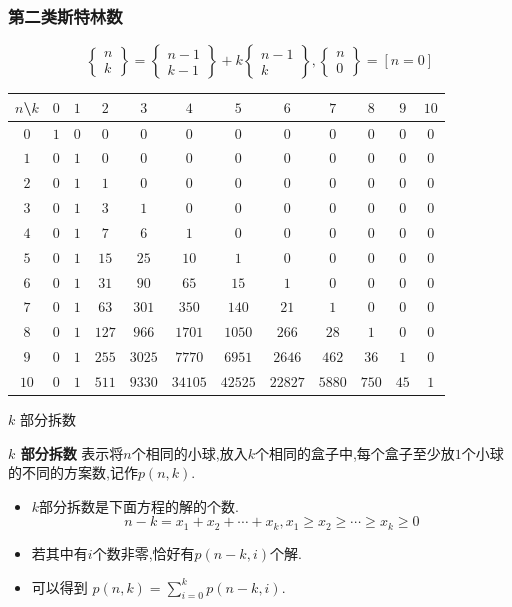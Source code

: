 \documentclass[aspectratio=169]{beamer}  %
\newcommand{\pau}{\pause}
\begin{document}
\begin{frame}[fragile]
    \frametitle{第二类斯特林数}
    $$\begin{Bmatrix}n\\k\end{Bmatrix}=\begin{Bmatrix}n-1\\k-1\end{Bmatrix}+k\begin{Bmatrix}n-1\\k\end{Bmatrix},\begin{Bmatrix}n\\0\end{Bmatrix}=[n=0]$$
	\begin{center}
		\footnotesize
		\begin{tabular}{c|ccccccccccc}
			$n$\textbackslash$k$&$0$&$1$&$2$&$3$&$4$&$5$&$6$&$7$&$8$&$9$&$10$\\\hline
			$0$&$1$&$0$&$0$&$0$&$0$&$0$&$0$&$0$&$0$&$0$&$0$\\
			$1$&$0$&$1$&$0$&$0$&$0$&$0$&$0$&$0$&$0$&$0$&$0$\\
			$2$&$0$&$1$&$1$&$0$&$0$&$0$&$0$&$0$&$0$&$0$&$0$\\
			$3$&$0$&$1$&$3$&$1$&$0$&$0$&$0$&$0$&$0$&$0$&$0$\\
			$4$&$0$&$1$&$7$&$6$&$1$&$0$&$0$&$0$&$0$&$0$&$0$\\
			$5$&$0$&$1$&$15$&$25$&$10$&$1$&$0$&$0$&$0$&$0$&$0$\\
			$6$&$0$&$1$&$31$&$90$&$65$&$15$&$1$&$0$&$0$&$0$&$0$\\
			$7$&$0$&$1$&$63$&$301$&$350$&$140$&$21$&$1$&$0$&$0$&$0$\\
			$8$&$0$&$1$&$127$&$966$&$1701$&$1050$&$266$&$28$&$1$&$0$&$0$\\
			$9$&$0$&$1$&$255$&$3025$&$7770$&$6951$&$2646$&$462$&$36$&$1$&$0$\\
			$10$&$0$&$1$&$511$&$9330$&$34105$&$42525$&$22827$&$5880$&$750$&$45$&$1$\\
		\end{tabular}
	\end{center}
\end{frame}

\begin{frame}[fragile]{$k$ 部分拆数}
    \begin{definition}{\textbf{$k$ 部分拆数}}
        表示将$n$个相同的小球,放入$k$个相同的盒子中,每个盒子至少放$1$个小球的不同的方案数,记作$p(n,k)$.
    \end{definition}\pau
    \begin{itemize}
    	\item $k$部分拆数是下面方程的解的个数.$$n-k=x_1+x_2+\cdots+x_k,x_1\geq x_2\geq\cdots\geq x_k\geq0$$\pau
    	\item 若其中有$i$个数非零,恰好有$p(n-k,i)$个解.\pau
    	\item 可以得到 $p(n,k)=\sum\limits_{i=0}^kp(n-k,i)$.
    \end{itemize}
\end{frame}
\end{document}
